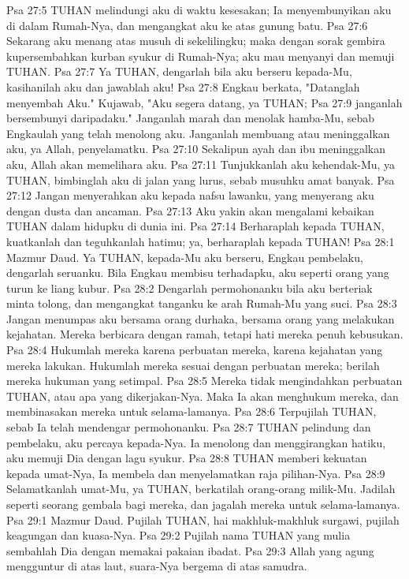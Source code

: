 Psa 27:5  TUHAN melindungi aku di waktu kesesakan; Ia menyembunyikan aku di dalam Rumah-Nya, dan mengangkat aku ke atas gunung batu.
Psa 27:6  Sekarang aku menang atas musuh di sekelilingku; maka dengan sorak gembira kupersembahkan kurban syukur di Rumah-Nya; aku mau menyanyi dan memuji TUHAN.
Psa 27:7  Ya TUHAN, dengarlah bila aku berseru kepada-Mu, kasihanilah aku dan jawablah aku!
Psa 27:8  Engkau berkata, "Datanglah menyembah Aku." Kujawab, "Aku segera datang, ya TUHAN;
Psa 27:9  janganlah bersembunyi daripadaku." Janganlah marah dan menolak hamba-Mu, sebab Engkaulah yang telah menolong aku. Janganlah membuang atau meninggalkan aku, ya Allah, penyelamatku.
Psa 27:10  Sekalipun ayah dan ibu meninggalkan aku, Allah akan memelihara aku.
Psa 27:11  Tunjukkanlah aku kehendak-Mu, ya TUHAN, bimbinglah aku di jalan yang lurus, sebab musuhku amat banyak.
Psa 27:12  Jangan menyerahkan aku kepada nafsu lawanku, yang menyerang aku dengan dusta dan ancaman.
Psa 27:13  Aku yakin akan mengalami kebaikan TUHAN dalam hidupku di dunia ini.
Psa 27:14  Berharaplah kepada TUHAN, kuatkanlah dan teguhkanlah hatimu; ya, berharaplah kepada TUHAN!
Psa 28:1  Mazmur Daud. Ya TUHAN, kepada-Mu aku berseru, Engkau pembelaku, dengarlah seruanku. Bila Engkau membisu terhadapku, aku seperti orang yang turun ke liang kubur.
Psa 28:2  Dengarlah permohonanku bila aku berteriak minta tolong, dan mengangkat tanganku ke arah Rumah-Mu yang suci.
Psa 28:3  Jangan menumpas aku bersama orang durhaka, bersama orang yang melakukan kejahatan. Mereka berbicara dengan ramah, tetapi hati mereka penuh kebusukan.
Psa 28:4  Hukumlah mereka karena perbuatan mereka, karena kejahatan yang mereka lakukan. Hukumlah mereka sesuai dengan perbuatan mereka; berilah mereka hukuman yang setimpal.
Psa 28:5  Mereka tidak mengindahkan perbuatan TUHAN, atau apa yang dikerjakan-Nya. Maka Ia akan menghukum mereka, dan membinasakan mereka untuk selama-lamanya.
Psa 28:6  Terpujilah TUHAN, sebab Ia telah mendengar permohonanku.
Psa 28:7  TUHAN pelindung dan pembelaku, aku percaya kepada-Nya. Ia menolong dan menggirangkan hatiku, aku memuji Dia dengan lagu syukur.
Psa 28:8  TUHAN memberi kekuatan kepada umat-Nya, Ia membela dan menyelamatkan raja pilihan-Nya.
Psa 28:9  Selamatkanlah umat-Mu, ya TUHAN, berkatilah orang-orang milik-Mu. Jadilah seperti seorang gembala bagi mereka, dan jagalah mereka untuk selama-lamanya.
Psa 29:1  Mazmur Daud. Pujilah TUHAN, hai makhluk-makhluk surgawi, pujilah keagungan dan kuasa-Nya.
Psa 29:2  Pujilah nama TUHAN yang mulia sembahlah Dia dengan memakai pakaian ibadat.
Psa 29:3  Allah yang agung mengguntur di atas laut, suara-Nya bergema di atas samudra.
